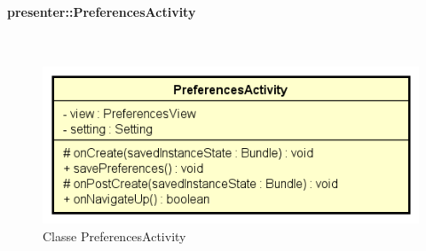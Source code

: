 \documentclass[../DefinizioneDiProdotto.tex]{subfiles}
\begin{document}
\paragraph{presenter::PreferencesActivity}
\
\begin{figure}[H]
	\centering
	\includegraphics[width=\maxwidth]{img/PreferencesActivity.png}
	\caption{Classe PreferencesActivity}\label{fig:presenter::PreferencesActivity} 
\end{figure}
\end{document}

